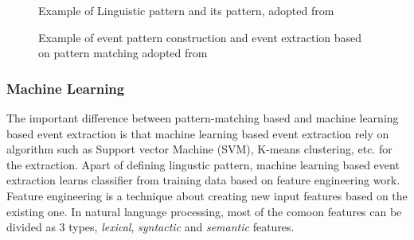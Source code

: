 \documentclass[twoside]{utmthesis}
\begin{document}
\begin{figure}[H]
	\centering
	\caption{Example of Linguistic pattern and its pattern, adopted from \cite{riloff1993automatically}}
	\label{fig:linguisticpattern}
\end{figure}
\vspace{-1.5cm}

\begin{figure}[H]
	\centering
	\caption{Example of event pattern construction and event extraction based on pattern matching adopted from \cite{xiang2019survey}}
	\label{fig:patternmatching}
\end{figure}
\vspace{-1.5cm}


\subsubsection{Machine Learning}
The important difference between pattern-matching based and machine learning based event extraction is that machine learning based event extraction rely on algorithm such as Support vector Machine (SVM), K-means clustering, etc. for the extraction. Apart of defining lingustic pattern, machine learning based event extraction learns classifier from training data based on feature engineering work. Feature engineering is a technique about creating new input features based on the existing one. In natural language processing, most of the comoon features can be divided as 3 types, \textit{lexical}, \textit{syntactic} and \textit{semantic} features. 
\end{document}
